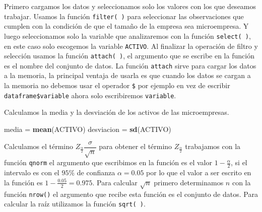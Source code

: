 \documentclass[letterpaper,]{book}
\newenvironment{Shaded}{\begin{snugshade}}{\end{snugshade}}
\newcommand{\DataTypeTok}[1]{\textcolor[rgb]{0.13,0.29,0.53}{#1}}
\newcommand{\KeywordTok}[1]{\textcolor[rgb]{0.13,0.29,0.53}{\textbf{#1}}}
\newcommand{\NormalTok}[1]{#1}
\newcommand{\OperatorTok}[1]{\textcolor[rgb]{0.81,0.36,0.00}{\textbf{#1}}}
\newcommand{\OtherTok}[1]{\textcolor[rgb]{0.56,0.35,0.01}{#1}}
\newcommand{\StringTok}[1]{\textcolor[rgb]{0.31,0.60,0.02}{#1}}
\begin{document}
Primero cargamos los datos y seleccionamos solo los valores con los que deseamos trabajar. Usamos la función \texttt{filter(\ )} para seleccionar las observaciones que cumplen con la condición de que el tamaño de la empresa sea microempresa. Y luego seleccionamos solo la variable que analizaremos con la función \texttt{select(\ )}, en este caso solo escogemos la variable \texttt{ACTIVO}. Al finalizar la operación de filtro y selección usamos la función \texttt{attach(\ )}, el argumento que se escribe en la función es el nombre del conjunto de datos. La función \texttt{attach} sirve para cargar los datos a la memoria, la principal ventaja de usarla es que cuando los datos se cargan a la memoria no debemos usar el operador \texttt{\$} por ejemplo en vez de escribir \texttt{dataframe\$variable} ahora solo escribiremos \texttt{variable}.

\begin{Shaded}
\end{Shaded}

Calculamos la media y la desviación de los activos de las microempresas.

\begin{Shaded}
\begin{Highlighting}[]
\NormalTok{media =}\StringTok{ }\KeywordTok{mean}\NormalTok{(ACTIVO)}
\NormalTok{desviacion =}\StringTok{ }\KeywordTok{sd}\NormalTok{(ACTIVO)}
\end{Highlighting}
\end{Shaded}

Calculamos el término \(Z_{\frac{\alpha}{2}}\dfrac{\sigma}{\sqrt{n}}\) para obtener el término \(Z_{\frac{\alpha}{2}}\) trabajamos con la función \texttt{qnorm} el argumento que escribimos en la función es el valor \(1-\frac{\alpha}{2}\), si el intervalo es con el \(95\%\) de confianza \(\alpha=0.05\) por lo que el valor a ser escrito en la función es \(1-\frac{0.05}{2}=0.975\). Para calcular \(\sqrt{n}\) primero determinamos \(n\) con la función \texttt{nrow()} el argumento que recibe esta función es el conjunto de datos. Para calcular la raíz utilizamos la función \texttt{sqrt(\ )}.
\end{document}
